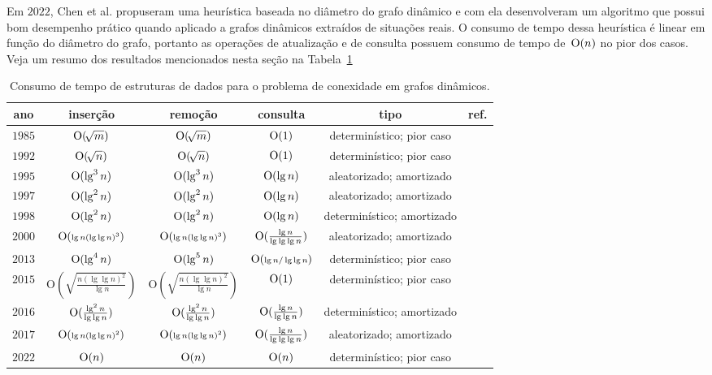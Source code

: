 Em $2022$, Chen et al. \cite{QC22} propuseram uma heurística baseada no diâmetro do grafo dinâmico e com ela desenvolveram um algoritmo que possui bom desempenho prático quando aplicado a grafos dinâmicos extraídos de situações reais.
O consumo de tempo dessa heurística é linear em função do diâmetro do grafo, portanto as operações de atualização e de consulta possuem consumo de tempo de~$\mathrm{O}(n)$ no pior dos casos.
Veja um resumo dos resultados mencionados nesta seção na Tabela~\ref{tab:historiografia}
\begin{table}[h!]
\centering
\begin{tabular}{||c | c | c | c | c | c||} 
 \hline
 ano & inserção & remoção & consulta & tipo & ref. \\ [0.5ex] 
 \hline\hline
	$1985$ & $\mathrm{O}(\!\sqrt{m})$ & $\mathrm{O}(\!\sqrt{m})$ & $\mathrm{O}(1)$  & {\small determinístico; pior caso} & \cite{frederickson1983data} \\ 
 \hline
	$1992$ & $\mathrm{O}(\!\sqrt{n})$ & $\mathrm{O}(\!\sqrt{n})$ & $\mathrm{O}(1)$  & {\small determinístico; pior caso} & \cite{Eppstein1992SparsificationaTF} \\ 
 \hline
	$1995$ & $\mathrm{O}(\lg^3 n)$ & $\mathrm{O}(\lg^3 n)$   & $\mathrm{O}(\lg n)$  & {\small aleatorizado; amortizado} & \cite{HenzingerKing} \\ 
 \hline
	$1997$ & $\mathrm{O}(\lg^2 n)$ & $\mathrm{O}(\lg^2 n)$   & $\mathrm{O}(\lg n)$  & {\small aleatorizado; amortizado} & \cite{HenzingerThorup} \\ 
 \hline
	$1998$ & $\mathrm{O}(\lg^2 n)$ & $\mathrm{O}(\lg^2 n)$   & $\mathrm{O}(\lg n)$  & {\small determinístico; amortizado} & \cite{poly_log} \\ 
 \hline
	$2000$ & $\mathrm{O}({\scriptstyle \lg n(\lg  \lg n)^3})$ &  $\mathrm{O}({\scriptstyle \lg n(\lg \lg n)^3})$      & $\mathrm{O}(\frac{\lg n}{\lg\lg\lg n})$  & {\small aleatorizado; amortizado }& \cite{Thorup2000} \\ 
 \hline
	$2013$ & $\mathrm{O}(\lg^4 n)$ & $\mathrm{O}(\lg^5 n)$ & $\mathrm{O}({\scriptstyle \lg n / \lg \lg n })$ & {\small determinístico; pior caso} & \cite{bruceM} \\
 \hline
	$2015$ & $ \mathrm{O}\!\left(\sqrt{\frac{n\left(\lg \lg n\right)^2}{\lg n}}\right)  $ & $\mathrm{O}\!\left(\sqrt{\frac{n\left(\lg \lg n\right)^2}{\lg n}}\right)$ & $\mathrm{O}(1)$ & {\small determinístico; pior caso} & \cite{kejlbergrasmussen_et_al} \\
 \hline
	$2016$ & $\mathrm{O}(  \frac{\lg^2 n}{\lg \lg n})$ & $\mathrm{O}( \frac{\lg^2 n}{\lg \lg n}) $   & $\mathrm{O}( \frac{\lg n}{\lg \lg n}) $  & {\small determinístico; amortizado} & \cite{Wulff-Nilsen2016} \\ 
 \hline
	$2017$ & $\mathrm{O}({\scriptstyle \lg n(\lg  \lg n)^2})$ &  $\mathrm{O}({\scriptstyle \lg n(\lg \lg n)^2})$      & $\mathrm{O}(\frac{\lg n}{\lg\lg\lg n})$  & {\small aleatorizado; amortizado }& \cite{fastestConn} \\ 
 \hline
	$2022$ & $\mathrm{O}(n)$ & $\mathrm{O}(n) $   & $\mathrm{O}(n) $  & {\small determinístico; pior caso } & \cite{QC22} \\ 
 \hline
\end{tabular}
\caption{Consumo de tempo de estruturas de dados para o problema de conexidade em grafos dinâmicos.}
\label{tab:historiografia}
\end{table}
